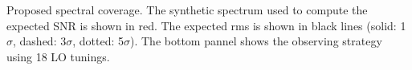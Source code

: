 Proposed spectral coverage. The synthetic spectrum used to compute the expected SNR is shown in red. The expected rms is shown in black lines (solid: 1$\sigma$, dashed: 3$\sigma$, dotted: 5$\sigma$). The bottom pannel shows the observing strategy using 18 LO tunings.